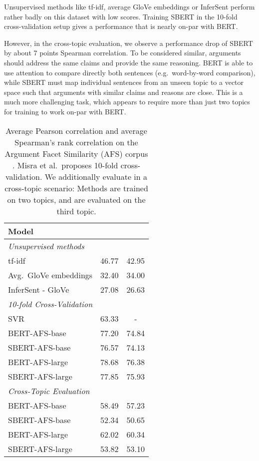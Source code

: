 \documentclass[11pt,a4paper]{article}
\begin{document}
Unsupervised methods like tf-idf, average GloVe embeddings or InferSent perform rather badly on this dataset with low scores. Training SBERT in the 10-fold cross-validation setup gives a performance that is nearly on-par with BERT. 

However, in the cross-topic evaluation, we observe a performance drop of SBERT by about 7 points Spearman correlation. To be considered similar, arguments should address the same claims and provide the same reasoning. BERT is able to use attention to compare directly both sentences (e.g.\ word-by-word comparison), while SBERT must map individual sentences from an unseen topic to a vector space such that arguments with similar claims and reasons are close. This is a much more challenging task, which appears to require more than just two topics for training to work on-par with BERT.  

\begin{table}[h]
	\centering 
	\footnotesize
	\begin{tabular}{|l|c|c|}
		\hline
		\textbf{Model} &  &  \\ \hline
		\multicolumn{3}{|l|}{\textit{Unsupervised  methods}} \\ \hline
		tf-idf & 46.77 & 42.95 \\
		Avg.\ GloVe embeddings & 32.40 & 34.00 \\
		InferSent - GloVe & 27.08 &  26.63  \\
		\hline 
		\multicolumn{3}{|l|}{\textit{10-fold Cross-Validation}} \\ \hline
		SVR \cite{MisraEW16} & 63.33 & - \\
		BERT-AFS-base & {77.20}  & {74.84}  \\
		SBERT-AFS-base & 76.57 & 74.13 \\
		BERT-AFS-large & {78.68} & {76.38}  \\
		SBERT-AFS-large & 77.85 & 75.93 \\
		\hline
		\multicolumn{3}{|l|}{\textit{Cross-Topic Evaluation}} \\ \hline
		BERT-AFS-base & {58.49} & {57.23} \\ 
		SBERT-AFS-base & 52.34  & 50.65 \\ 
		BERT-AFS-large & {62.02} & {60.34}  \\ 
		SBERT-AFS-large & 53.82 & 53.10 \\ \hline 		
	\end{tabular}
	\caption{Average Pearson correlation  and average Spearman's rank correlation  on the Argument Facet Similarity (AFS) corpus \cite{MisraEW16}. Misra et al.\ proposes 10-fold cross-validation. We additionally evaluate in a cross-topic scenario: Methods are trained on two topics, and are evaluated on the third topic.}
	\label{table_afs}
\end{table}
\end{document}

